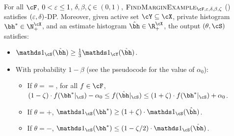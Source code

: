 \begin{algorithm}[t]
{{                
            }
        }
\end{algorithm}



\begin{lemma} \label{lem:bad-margin}
    For all $\cF$, $0<\varepsilon \leq 1$, 
    $\delta, \beta, \zeta \in (0, 1)$, $\FindMarginExample_{\cF,\eps,\delta,\beta,\zeta}$ () satisfies $(\varepsilon, \delta)$-DP. 
    Moreover, given active set $\cY\subseteq\cX$, private histogram $\bh^{\ast}\in\N_+^{\cX}$, 
    and an estimate histogram $\hbh\in\R_+^{\cX}$, the output $(\theta, \cS)$ satisfies:
    \begin{itemize}
    \item $\ind_\cS(\hbh) \geq \frac{1}{3} \ind_{\cY}(\hbh)$.
    \item With probability $1-\beta$ (see the pseudocode for the value of $\alpha_0$):
        \begin{itemize}
            \item If $\theta = \equal$, for all $f\in \cF$, $(1 - \zeta) \cdot f(\bh^{\ast}|_{\cS}) - \alpha_0 \leq f(\hbh|_{\cS})  \leq (1 + \zeta) \cdot f(\bh^{\ast}|_{\cS}) + \alpha_0$.
            \item If $\theta = \plus$, $\ind_{\cS}(\bh^{\ast})  \geq (1 + \zeta) \cdot \ind_{\cS}(\hbh)$.
            \item If $\theta = \minus$, $\ind_{\cS}(\bh^{\ast}) \leq (1 - \zeta/2) \cdot \ind_{\cS}(\hbh)$.
        \end{itemize}
    \end{itemize}
\end{lemma}

